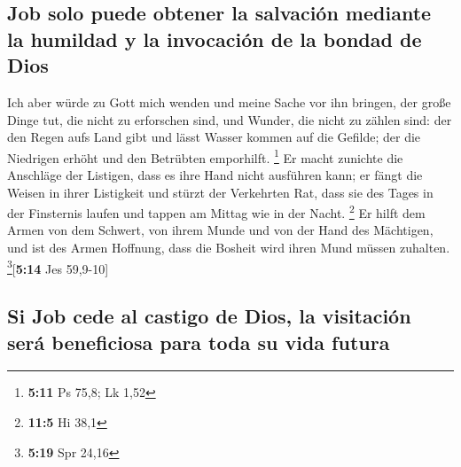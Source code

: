 \hypertarget{job-solo-puede-obtener-la-salvaciuxf3n-mediante-la-humildad-y-la-invocaciuxf3n-de-la-bondad-de-dios}{%
\subsection{Job solo puede obtener la salvación mediante la humildad y
la invocación de la bondad de
Dios}\label{job-solo-puede-obtener-la-salvaciuxf3n-mediante-la-humildad-y-la-invocaciuxf3n-de-la-bondad-de-dios}}

 Ich aber würde zu Gott mich wenden und meine Sache vor
ihn bringen,  der große Dinge tut, die nicht zu erforschen
sind, und Wunder, die nicht zu zählen sind:  der den
Regen aufs Land gibt und lässt Wasser kommen auf die Gefilde;
 der die Niedrigen erhöht und den Betrübten emporhilft.
\footnote{\textbf{5:11} Ps 75,8; Lk 1,52}  Er macht
zunichte die Anschläge der Listigen, dass es ihre Hand nicht ausführen
kann;  er fängt die Weisen in ihrer Listigkeit und stürzt
der Verkehrten Rat,  dass sie des Tages in der Finsternis
laufen und tappen am Mittag wie in der Nacht. \footnote{\textbf{11:5} Hi
  38,1}  Er hilft dem Armen von dem Schwert, von ihrem
Munde und von der Hand des Mächtigen,  und ist des Armen
Hoffnung, dass die Bosheit wird ihren Mund müssen zuhalten.
\footnote{\textbf{5:19} Spr 24,16}{[}\textbf{5:14} Jes 59,9-10{]}

\hypertarget{si-job-cede-al-castigo-de-dios-la-visitaciuxf3n-seruxe1-beneficiosa-para-toda-su-vida-futura}{%
\subsection{Si Job cede al castigo de Dios, la visitación será
beneficiosa para toda su vida
futura}\label{si-job-cede-al-castigo-de-dios-la-visitaciuxf3n-seruxe1-beneficiosa-para-toda-su-vida-futura}}

